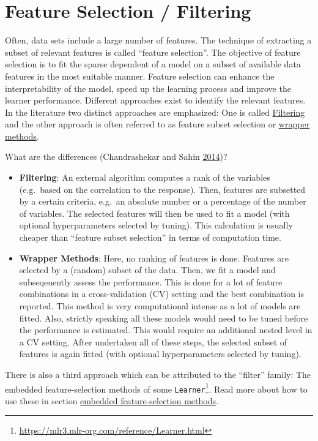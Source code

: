 \documentclass[12pt,]{scrbook}
\providecommand{\tightlist}{%
  \setlength{\itemsep}{0pt}\setlength{\parskip}{0pt}}
\renewcommand{\href}[2]{#2\footnote{\url{#1}}}
\begin{document}
\hypertarget{fs}{%
\section{Feature Selection / Filtering}\label{fs}}

Often, data sets include a large number of features.
The technique of extracting a subset of relevant features is called ``feature selection''.
The objective of feature selection is to fit the sparse dependent of a model on a subset of available data features in the most suitable manner.
Feature selection can enhance the interpretability of the model, speed up the learning process and improve the learner performance.
Different approaches exist to identify the relevant features.
In the literature two distinct approaches are emphasized:
One is called \protect\hyperlink{fs-filtering}{Filtering} and the other approach is often referred to as feature subset selection or \protect\hyperlink{fs-wrapper}{wrapper methods}.

What are the differences (Chandrashekar and Sahin \protect\hyperlink{ref-chandrashekar2014}{2014})?

\begin{itemize}
\tightlist
\item
  \textbf{Filtering}: An external algorithm computes a rank of the variables (e.g.~based on the correlation to the response).
  Then, features are subsetted by a certain criteria, e.g.~an absolute number or a percentage of the number of variables.
  The selected features will then be used to fit a model (with optional hyperparameters selected by tuning).
  This calculation is usually cheaper than ``feature subset selection'' in terms of computation time.
\item
  \textbf{Wrapper Methods}: Here, no ranking of features is done.
  Features are selected by a (random) subset of the data.
  Then, we fit a model and subseqeuently assess the performance.
  This is done for a lot of feature combinations in a cross-validation (CV) setting and the best combination is reported.
  This method is very computational intense as a lot of models are fitted.
  Also, strictly speaking all these models would need to be tuned before the performance is estimated.
  This would require an additional nested level in a CV setting.
  After undertaken all of these steps, the selected subset of features is again fitted (with optional hyperparameters selected by tuning).
\end{itemize}

There is also a third approach which can be attributed to the ``filter'' family:
The embedded feature-selection methods of some \href{https://mlr3.mlr-org.com/reference/Learner.html}{\texttt{Learner}}.
Read more about how to use these in section \protect\hyperlink{fs-embedded}{embedded feature-selection methods}.
\end{document}
